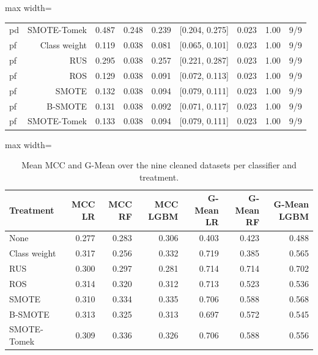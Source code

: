 \begin{table}[t]
\begin{adjustbox}{max width=\linewidth}
\begin{tabular}{lrrrrrrrr}
pd & SMOTE-Tomek & 0.487 & 0.248 & 0.239 & [0.204, 0.275] & 0.023 & 1.00 & 9/9 \\
pf & Class weight & 0.119 & 0.038 & 0.081 & [0.065, 0.101] & 0.023 & 1.00 & 9/9 \\
pf & RUS & 0.295 & 0.038 & 0.257 & [0.221, 0.287] & 0.023 & 1.00 & 9/9 \\
pf & ROS & 0.129 & 0.038 & 0.091 & [0.072, 0.113] & 0.023 & 1.00 & 9/9 \\
pf & SMOTE & 0.132 & 0.038 & 0.094 & [0.079, 0.111] & 0.023 & 1.00 & 9/9 \\
pf & B-SMOTE & 0.131 & 0.038 & 0.092 & [0.071, 0.117] & 0.023 & 1.00 & 9/9 \\
pf & SMOTE-Tomek & 0.133 & 0.038 & 0.094 & [0.079, 0.111] & 0.023 & 1.00 & 9/9 \\
\bottomrule
\end{tabular}
\end{adjustbox}
\end{table}

\begin{table}[t]
\centering
\footnotesize
\caption{Mean MCC and G-Mean over the nine cleaned datasets per classifier and treatment.}
\label{tab:perclf}
\begin{adjustbox}{max width=\linewidth}
\begin{tabular}{lrrrrrr}
\toprule
Treatment & MCC LR & MCC RF & MCC LGBM & G-Mean LR & G-Mean RF & G-Mean LGBM \\
\midrule
None & 0.277 & 0.283 & 0.306 & 0.403 & 0.423 & 0.488 \\
Class weight & 0.317 & 0.256 & 0.332 & 0.719 & 0.385 & 0.565 \\
RUS & 0.300 & 0.297 & 0.281 & 0.714 & 0.714 & 0.702 \\
ROS & 0.314 & 0.320 & 0.312 & 0.713 & 0.523 & 0.536 \\
SMOTE & 0.310 & 0.334 & 0.335 & 0.706 & 0.588 & 0.568 \\
B-SMOTE & 0.313 & 0.325 & 0.313 & 0.697 & 0.572 & 0.545 \\
SMOTE-Tomek & 0.309 & 0.336 & 0.326 & 0.706 & 0.588 & 0.556 \\
\bottomrule
\end{tabular}
\end{adjustbox}
\end{table}

